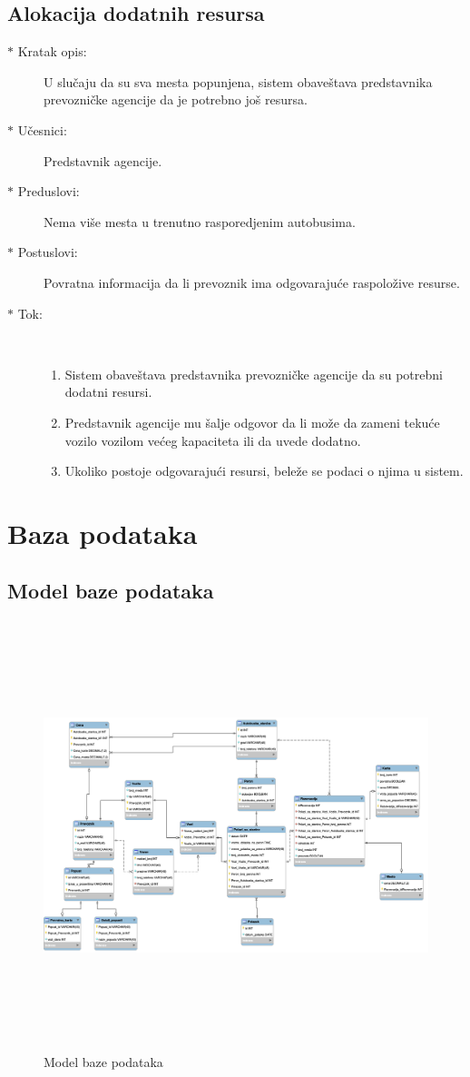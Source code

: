 \subsection{Alokacija dodatnih resursa}
\begin{description}
	\item[$\ast$ Kratak opis: ] U slu\v caju da su sva mesta popunjena, sistem obave\v stava predstavnika prevozni\v cke agencije da je potrebno jo\v s resursa. 
	\item[$\ast$ U\v cesnici: ] Predstavnik agencije.
	\item[$\ast$ Preduslovi: ] Nema vi\v se mesta u trenutno rasporedjenim autobusima.
	\item[$\ast$ Postuslovi: ] Povratna informacija da li prevoznik ima odgovaraju\'ce raspolo\v zive resurse.
	\item[$\ast$ Tok: ] \ \\
	\begin{enumerate}
		\item Sistem obave\v stava predstavnika prevozni\v cke agencije da su potrebni dodatni resursi.
		\item Predstavnik agencije mu \v salje odgovor da li mo\v ze da zameni teku\'ce vozilo vozilom ve\'ceg kapaciteta ili da uvede dodatno.
		\item Ukoliko postoje odgovaraju\'ci resursi, bele\v ze se podaci o njima u sistem.
	\end{enumerate}
\end{description}

\newpage

\section{Baza podataka}
\subsection{Model baze podataka}
\begin{figure}[h]
	\centering
	\includegraphics[width=17cm, height = 12.5cm]{../Slike/baza.png}
	\caption{Model baze podataka}
	\label{fig:baza}
\end{figure}	
